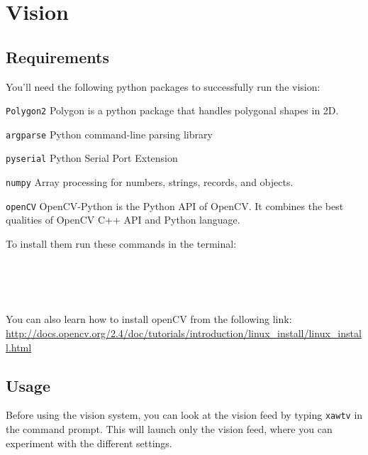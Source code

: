 \section{Vision}

\subsection{Requirements}
You'll need the following python packages to successfully run the vision:

\begin{description}
\item \texttt{Polygon2} Polygon is a python package that handles polygonal shapes in 2D. 
\item \texttt{argparse} Python command-line parsing library
\item \texttt{pyserial} Python Serial Port Extension
\item \texttt{numpy} Array processing for numbers, strings, records, and objects.
\item \texttt{openCV} OpenCV-Python is the Python API of OpenCV. It combines the best qualities of OpenCV C++ API and Python language.
\end{description}

To install them run these commands in the terminal:

 \\
 \\
 \\

You can also learn how to install openCV from the following link:
\url{http://docs.opencv.org/2.4/doc/tutorials/introduction/linux_install/linux_install.html}

\subsection{Usage}
Before using the vision system, you can look at the vision feed by typing \texttt{xawtv} in the command prompt. This will launch only the vision feed, where you can experiment with the different settings.

